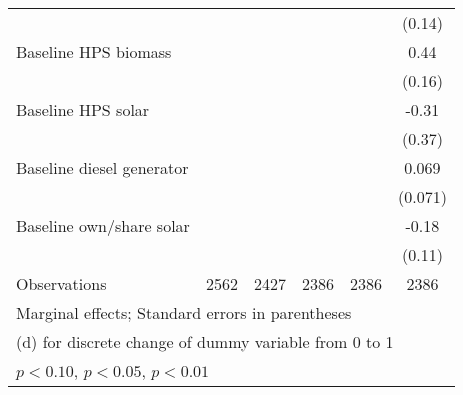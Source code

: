 \begin{table}[htbp]
\begin{tabular*}{1\hsize}{@{\hskip\tabcolsep\extracolsep\fill}l*{5}{c}}
                &                  &                  &                  &                  &   (0.14)         \\
Baseline HPS biomass&                  &                  &                  &                  &     0.44\sym{***}\\
                &                  &                  &                  &                  &   (0.16)         \\
Baseline HPS solar&                  &                  &                  &                  &    -0.31         \\
                &                  &                  &                  &                  &   (0.37)         \\
Baseline diesel generator&                  &                  &                  &                  &    0.069         \\
                &                  &                  &                  &                  &  (0.071)         \\
Baseline own/share solar&                  &                  &                  &                  &    -0.18\sym{*}  \\
                &                  &                  &                  &                  &   (0.11)         \\
\midrule
Observations    &     2562         &     2427         &     2386         &     2386         &     2386         \\
\bottomrule
\multicolumn{6}{l}{\footnotesize Marginal effects; Standard errors in parentheses}\\
\multicolumn{6}{l}{\footnotesize  (d) for discrete change of dummy variable from 0 to 1}\\
\multicolumn{6}{l}{\footnotesize \sym{*} \(p<0.10\), \sym{**} \(p<0.05\), \sym{***} \(p<0.01\)}\\
\end{tabular*}
\end{table}

